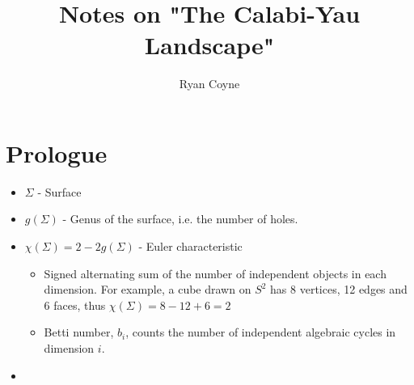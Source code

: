 \documentclass[12pt]{article}
\begin{document}
    \title{Notes on "The Calabi-Yau Landscape"}
    \author{Ryan Coyne}
    \date{}
    \maketitle
    \section{Prologue}
    \begin{itemize}
        \item \(\Sigma\) - Surface
        \item \(g(\Sigma)\) - Genus of the surface, i.e. the number of holes.
        \item \(\chi(\Sigma) = 2 - 2g(\Sigma)\) - Euler characteristic
        \begin{itemize}
            \item Signed alternating sum of the number of independent objects in each dimension. For example, a cube drawn on \(S^2\) has 8 vertices, 12 edges and 6 faces, thus \(\chi(\Sigma) = 8 - 12 + 6 = 2\)
            \item Betti number, \(b_i\), counts the number of independent algebraic cycles in dimension \(i\).
        \end{itemize}
        \item 
    \end{itemize}
\end{document}
